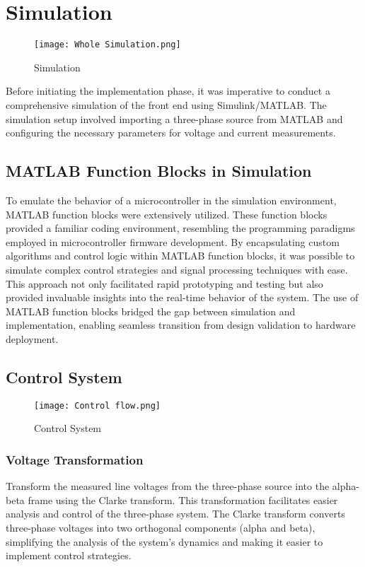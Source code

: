 \section{Simulation}
\begin{figure}[h]
    \centering
    \texttt{[image: Whole Simulation.png]}
    \caption{Simulation}
    \label{fig:Simulation}
\end{figure}
Before initiating the implementation phase, it was imperative to conduct a
comprehensive simulation of the front end using Simulink/MATLAB. The simulation
setup involved importing a three-phase source from MATLAB and configuring the
necessary parameters for voltage and current measurements.

\subsection{MATLAB Function Blocks in Simulation}
To emulate the behavior of a microcontroller in the simulation environment,
MATLAB function blocks were extensively utilized. These function blocks
provided a familiar coding environment, resembling the programming paradigms
employed in microcontroller firmware development. By encapsulating custom
algorithms and control logic within MATLAB function blocks, it was possible to
simulate complex control strategies and signal processing techniques with ease.
This approach not only facilitated rapid prototyping and testing but also
provided invaluable insights into the real-time behavior of the system. The use
of MATLAB function blocks bridged the gap between simulation and
implementation, enabling seamless transition from design validation to hardware
deployment.
\subsection{Control System}
\begin{figure}[h]
    \centering
    \texttt{[image: Control flow.png]}
    \caption{Control System}
    \label{fig:Control System}
\end{figure}
\subsubsection{Voltage Transformation}
Transform the measured line voltages from the three-phase source into the
alpha-beta frame using the Clarke transform. This transformation facilitates
easier analysis and control of the three-phase system. The Clarke transform
converts three-phase voltages into two orthogonal components (alpha and beta),
simplifying the analysis of the system's dynamics and making it easier to
implement control strategies.


